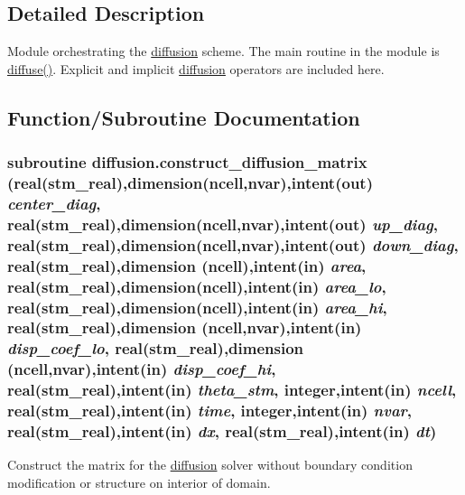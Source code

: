 \subsection{Detailed Description}
Module orchestrating the \hyperlink{a00056}{diffusion} scheme. The main routine in the module is \hyperlink{a00056_b108f04e81c5fda27fe18ee2aa18086c}{diffuse()}. Explicit and implicit \hyperlink{a00056}{diffusion} operators are included here. 



\subsection{Function/Subroutine Documentation}
\hypertarget{a00056_5b532c0d826dac456883290b6350db07}{
\subsubsection[{construct\_\-diffusion\_\-matrix}]{\setlength{\rightskip}{0pt plus 5cm}subroutine diffusion.construct\_\-diffusion\_\-matrix (real(stm\_\-real),dimension(ncell,nvar),intent(out) {\em center\_\-diag}, \/  real(stm\_\-real),dimension(ncell,nvar),intent(out) {\em up\_\-diag}, \/  real(stm\_\-real),dimension(ncell,nvar),intent(out) {\em down\_\-diag}, \/  real(stm\_\-real),dimension (ncell),intent(in) {\em area}, \/  real(stm\_\-real),dimension(ncell),intent(in) {\em area\_\-lo}, \/  real(stm\_\-real),dimension(ncell),intent(in) {\em area\_\-hi}, \/  real(stm\_\-real),dimension (ncell,nvar),intent(in) {\em disp\_\-coef\_\-lo}, \/  real(stm\_\-real),dimension (ncell,nvar),intent(in) {\em disp\_\-coef\_\-hi}, \/  real(stm\_\-real),intent(in) {\em theta\_\-stm}, \/  integer,intent(in) {\em ncell}, \/  real(stm\_\-real),intent(in) {\em time}, \/  integer,intent(in) {\em nvar}, \/  real(stm\_\-real),intent(in) {\em dx}, \/  real(stm\_\-real),intent(in) {\em dt})}}
\label{a00056_5b532c0d826dac456883290b6350db07}


Construct the matrix for the \hyperlink{a00056}{diffusion} solver without boundary condition modification or structure on interior of domain. 

